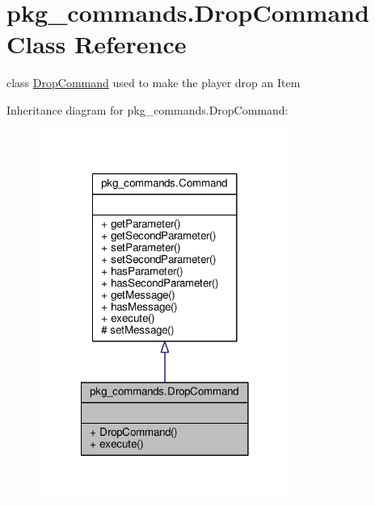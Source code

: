 \hypertarget{classpkg__commands_1_1DropCommand}{\section{pkg\-\_\-commands.\-Drop\-Command Class Reference}
\label{classpkg__commands_1_1DropCommand}
}


class \hyperlink{classpkg__commands_1_1DropCommand}{Drop\-Command} used to make the player drop an Item  




Inheritance diagram for pkg\-\_\-commands.\-Drop\-Command\-:
\nopagebreak
\begin{figure}[H]
\begin{center}
\leavevmode
\includegraphics[width=234pt]{classpkg__commands_1_1DropCommand__inherit__graph}
\end{center}
\end{figure}


